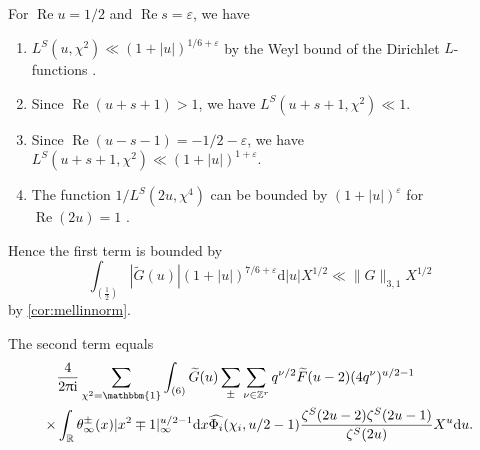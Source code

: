 \documentclass[10pt,oneside,reqno]{amsart}
\makeatletter
\let\SSec\S
\newcommand\rmd{\mathrm{d}}
\newcommand\rmi{\mathrm{i}}
\newcommand\RR{\mathbb{R}}
\newcommand\ZZ{\mathbb{Z}}
\renewcommand\S{\mathsf{S}}
\newcommand\triv{\mathbbm{1}}
\newcommand\dpii{2\uppi\rmi}
\renewcommand\Re{\mathop{\mathrm{Re}}}
\theoremstyle{THEOREM}
\theoremstyle{DEFINITION}
\theoremstyle{EXERCISE}
\numberwithin{equation}{section}
\renewenvironment{proof}[1][\proofname]{\par
  \vspace{-6pt}
  \pushQED{\qed}
  \normalfont \topsep6\p@\@plus6\p@\relax
  \trivlist
  \item[\hskip\labelsep\rmfamily\bfseries
    #1\@addpunct{:}]\ignorespaces
}{
  \popQED\endtrivlist\@endpefalse
  \vspace{-6pt}
}
\makeatother
\begin{document}
\begin{proof}
For $\Re u=1/2$ and $\Re s=\varepsilon$, we have
\begin{enumerate}[itemsep=0pt,parsep=0pt,topsep=0pt,leftmargin=0pt,labelsep=3pt,itemindent=9pt,label=\textbullet]
  \item $L^S(u,\chi^2)\ll (1+|u|)^{1/6+\varepsilon}$ by the Weyl bound of the Dirichlet $L$-functions \cite{petrow2023}.
  \item Since $\Re(u+s+1)>1$, we have $L^S(u+s+1,\chi^2)\ll 1$.
  \item Since $\Re(u-s-1)=-1/2-\varepsilon$, we have $L^S(u+s+1,\chi^2)\ll (1+|u|)^{1+\varepsilon}$.
  \item The function $1/L^S(2u,\chi^4)$ can be bounded by $(1+|u|)^\varepsilon$ for $\Re(2u)=1$ \cite[Chapter II of \SSec 8.3]{tenenbaum2015analytic}. 
\end{enumerate} 
Hence the first term is bounded by
\[
\int_{(\frac12)}|\widetilde{G}(u)|(1+|u|)^{7/6+\varepsilon} \rmd |u|X^{1/2}\ll \|G\|_{3,1}X^{1/2}
\]
by \autoref{cor:mellinnorm}.

The second term equals
\begin{equation}\label{eq:secondterm1}
\begin{split}
&\frac{4}{\dpii}\sum_{\chi^2=\triv}\int_{(6)}\widetilde{G}(u)\sum_{\pm}\sum_{\nu\in \ZZ^r}q^{\nu/2}\widetilde{F}(u-2)(4q^\nu)^{u/2-1}\\
\times&\int_{\RR}\theta_\infty^\pm(x)|x^2\mp 1|_\infty^{u/2-1}\rmd x\widehat{\Phi_i}(\chi_i,u/2-1) \frac{\zeta^S(2u-2)\zeta^S(2u-1)}{\zeta^S(2u)}X^u\rmd u.
\end{split}
\end{equation}


\end{proof}
\end{document}
